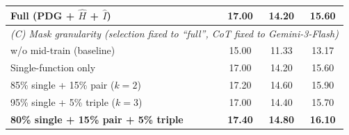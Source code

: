 \begin{table}[t]
\begin{tabular}{lccc}
\textbf{Full (PDG + $\hat{H}$ + $\hat{I}$)} & \textbf{17.00} & \textbf{14.20} & \textbf{15.60} \\
\midrule
\multicolumn{4}{l}{\emph{(C) Mask granularity (selection fixed to ``full'', CoT fixed to Gemini-3-Flash)}} \\
\midrule
w/o mid-train (baseline)             & 15.00 & 11.33 & 13.17 \\
Single-function only                 & 17.00 & 14.20 & 15.60 \\
85\% single + 15\% pair ($k=2$)       & 17.20 & 14.60 & 15.90 \\
95\% single + 5\% triple ($k=3$)      & 17.00 & 14.40 & 15.70 \\
\textbf{80\% single + 15\% pair + 5\% triple} & \textbf{17.40} & \textbf{14.80} & \textbf{16.10} \\
\bottomrule
\end{tabular}
\end{table}




